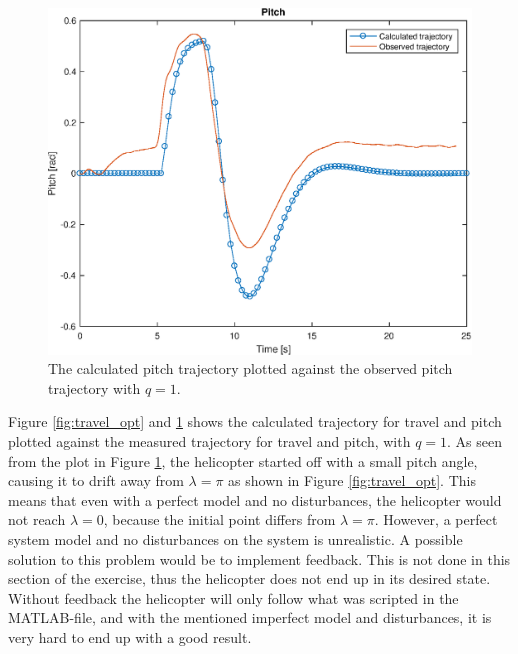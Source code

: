 \begin{figure}[H]
\captionsetup{justification=centering}
\includegraphics[scale=0.56]{data_10.2/Calculated_vs_Observed_Pitch_q_1.eps} 
\centering
\caption{The calculated pitch trajectory plotted against the observed pitch trajectory with $q = 1$.}
\label{fig:pitch_opt}
\end{figure}

Figure \ref{fig:travel_opt} and \ref{fig:pitch_opt} shows the calculated trajectory for travel and pitch plotted against the measured trajectory for travel and pitch, with $q = 1$. As seen from the plot in Figure \ref{fig:pitch_opt}, the helicopter started off with a small pitch angle, causing it to drift away from $\lambda = \pi$ as shown in Figure \ref{fig:travel_opt}. This means that even with a perfect model and no disturbances, the helicopter would not reach $\lambda = 0$, because the initial point differs from $\lambda = \pi$. However, a perfect system model and no disturbances on the system is unrealistic. A possible solution to this problem would be to implement feedback. This is not done in this section of the exercise, thus the helicopter does not end up in its desired state. Without feedback the helicopter will only follow what was scripted in the MATLAB-file, and with the mentioned imperfect model and disturbances, it is very hard to end up with a good result. 

